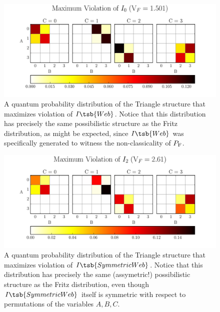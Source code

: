 \documentclass[aps, 10pt, english, twoside, pra, nofootinbib, tightenlines, longbibliography, superscriptaddress]{revtex4-1}
\begin{document}
    \begin{figure}
    \begin{nscenter}
        \includegraphics[scale=0.6,trim={0 0 0 0.4in},clip]{../../figures/distributions/plotted_dist_I_1_max_violation_2017.pdf}
        \caption{A quantum probability distribution of the Triangle structure that maximizes violation of $I\tsb{Web}$. Notice that this distribution has precisely the same possibilistic structure as the Fritz distribution, as might be expected, since $I\tsb{Web}$ was specifically generated to witness the non-classicality of $\prob[\fritz]$.}
        \label{fig:maximum_violation_I_1}
    \end{nscenter}
    \end{figure}
    \begin{figure}
    \begin{nscenter}
        \includegraphics[scale=0.6,trim={0 0 0 0.4in},clip]{../../figures/distributions/plotted_dist_I_3_max_violation_2017.pdf}
        \caption{A quantum probability distribution of the Triangle structure that maximizes violation of $I\tsb{SymmetricWeb}$. Notice that this distribution has precisely the same (assymetric!) possibilistic structure as the Fritz distribution, even though $I\tsb{SymmetricWeb}$ itself is symmetric with respect to permutations of the variables $A, B, C$. }
        \label{fig:maximum_violation_I_3}
    \end{nscenter}
    \end{figure}
\end{document}
